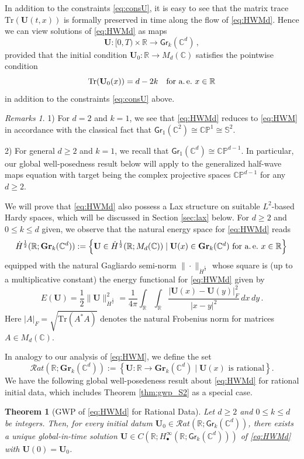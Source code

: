 \documentclass[11pt,reqno]{amsart}
\newtheorem{thm}{Theorem}[section]
\theoremstyle{definition}
\theoremstyle{remark}
\theoremstyle{remark}
\newtheorem*{remarks*}{Remarks}
\numberwithin{equation}{section}
\newcommand{\C}{\mathbb{C}}
\newcommand{\R}{\mathbb{R}}
\newcommand{\Ss}{\mathbb{S}}
\newcommand{\be}{\begin{equation}}
\newcommand{\ee}{\end{equation}}
\newcommand{\Ub}{\mathbf{U}}
\newcommand{\Tr}{\mathrm{Tr}}
\newcommand{\Gr}{\mathsf{Gr}}
\begin{document}
In addition to the constraints \eqref{eq:consU}, it is easy to see that the matrix trace $\mathrm{Tr}(\Ub(t,x))$ is formally preserved in time along the flow of \eqref{eq:HWMd}. Hence we can view solutions of \eqref{eq:HWMd} as maps 
$$
\Ub : [0,T) \times \R \to \Gr_k(\C^d) \, ,
$$ 
provided that the initial condition $\Ub_0 : \R \to M_d(\C)$ satisfies the pointwise condition
\be \label{eq:trace}
\Tr(\Ub_0(x))= d-2k \quad \mbox{for a.\,e.~$x \in \R$}
\ee
in addition to the constraints \eqref{eq:consU} above. 

\begin{remarks*}
1) For $d=2$ and $k=1$, we see that \eqref{eq:HWMd} reduces to \eqref{eq:HWM} in accordance with the classical fact that $\Gr_1(\C^2) \cong \mathbb{CP}^1 \cong \Ss^2$. 

2) For general $d \geq 2$ and $k=1$, we recall that $\Gr_1(\C^d) \cong \mathbb{CP}^{d-1}$. In particular, our global well-posedness result below will apply to the generalized half-wave maps equation with target being the complex projective spaces $\mathbb{CP}^{d-1}$ for any $d \geq 2$.  
\end{remarks*}

We will prove that \eqref{eq:HWMd} also possess a Lax structure on suitable $L^2$-based Hardy spaces, which will be discussed in Section \ref{sec:lax} below. For $d\geq 2$ and $0 \leq k \leq d$ given,  we observe that the natural energy space for \eqref{eq:HWMd} reads
$$
\dot{H}^{\frac 1 2}(\R; \mathbf{Gr}_k(\C^d))  := \left \{ \Ub \in \dot{H}^{\frac 1 2}(\R; M_d(\C)) \mid \mbox{$\Ub(x) \in \mathbf{Gr}_k(\C^d)$ for a.\,e.~$x \in \R$} \right \} \, 
$$
equipped with the natural Gagliardo semi-norm $\| \cdot \|_{\dot{H}^{\frac 1 2}}$ whose square is  (up to a multiplicative constant)  the energy functional for \eqref{eq:HWMd} given by
\be
E(\Ub) = \frac{1}{2} \| \Ub \|_{\dot{H}^{\frac 1 2}}^2 = \frac{1}{4 \pi} \int_{\R} \int_{\R} \frac{ | \Ub(x)- \Ub(y)|_F^2}{|x-y|^2} \, dx \, dy \, .
\ee
Here $| A |_F = \sqrt{\Tr(A^* A)}$ denotes the natural Frobenius norm for matrices $A \in M_d(\C)$.

In analogy to our analysis of \eqref{eq:HWM}, we define the set 
$$
\mathcal{R}at(\R; \mathbf{Gr}_k(\C^d)) := \left \{ \Ub : \R \to \mathbf{Gr}_k(\C^d) \mid \mbox{$\Ub(x)$ is rational} \right \}  .
$$
We have the following global well-posedeness result about \eqref{eq:HWMd} for rational initial data, which includes Theorem \ref{thm:gwp_S2} as a special case.

\begin{thm}[GWP of \eqref{eq:HWMd} for Rational Data] \label{thm:gwp}
Let $d \geq 2$ and $0 \leq k\leq d$ be integers. Then, for every initial datum $\Ub_0 \in \mathcal{R}at(\R; \Gr_k(\C^d))$, there exists a unique global-in-time solution $\Ub \in C(\R; H^\infty_\bullet(\R; \Gr_k(\C^d)))$ of \eqref{eq:HWMd} with  $\Ub(0) = \Ub_0$.
\end{thm}
\end{document}
